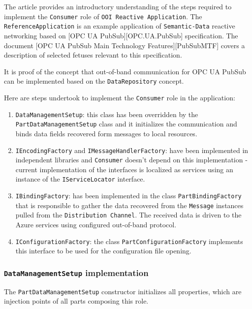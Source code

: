 \documentclass[
]{article}
\providecommand{\tightlist}{%
  \setlength{\itemsep}{0pt}\setlength{\parskip}{0pt}}
\begin{document}
The article provides an introductory understanding of the steps required to implement the \texttt{Consumer} role of \texttt{OOI\ Reactive\ Application}. The \texttt{ReferenceApplication} is an example application of \texttt{Semantic-Data} reactive networking based on {[}OPC UA PubSub{]}{[}OPC.UA.PubSub{]} specification. The document {[}OPC UA PubSub Main Technology Features{]}{[}PubSubMTF{]} covers a description of selected fetuses relevant to this specification.

It is proof of the concept that out-of-band communication for OPC UA PubSub can be implemented based on the \texttt{DataRepository} concept.

Here are steps undertook to implement the \texttt{Consumer} role in the application:

\begin{enumerate}
\def\labelenumi{\arabic{enumi}.}
\tightlist
\item
  \texttt{DataManagementSetup}: this class has been overridden by the \texttt{PartDataManagementSetup} class and it initializes the communication and binds data fields recovered form messages to local resources.
\item
  \texttt{IEncodingFactory} and \texttt{IMessageHandlerFactory}: have been implemented in independent libraries and \texttt{Consumer} doesn't depend on this implementation - current implementation of the interfaces is localized as services using an instance of the \texttt{IServiceLocator} interface.
\item
  \texttt{IBindingFactory}: has been implemented in the class \texttt{PartBindingFactory} that is responsible to gather the data recovered from the \texttt{Message} instances pulled from the \texttt{Distribution\ Channel}. The received data is driven to the Azure services using configured out-of-band protocol.
\item
  \texttt{IConfigurationFactory}: the class \texttt{PartConfigurationFactory} implements this interface to be used for the configuration file opening.
\end{enumerate}

\hypertarget{datamanagementsetup-implementation}{%
\subsubsection{\texorpdfstring{\texttt{DataManagementSetup} implementation}{DataManagementSetup implementation}}\label{datamanagementsetup-implementation}}

The \texttt{PartDataManagementSetup} constructor initializes all properties, which are injection points of all parts composing this role.
\end{document}
